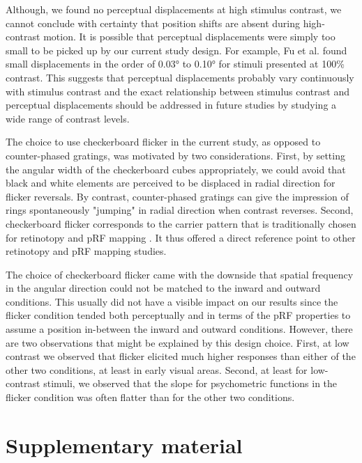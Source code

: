 Although, we found no perceptual displacements at high stimulus contrast, we cannot conclude with certainty that position shifts are absent during high-contrast motion. It is possible that perceptual displacements were simply too small to be picked up by our current study design. For example, Fu et al. \parencite*{Fu2004} found small displacements in the order of 0.03° to 0.10° for stimuli presented at 100\% contrast. This suggests that perceptual displacements probably vary continuously with stimulus contrast and the exact relationship between stimulus contrast and perceptual displacements should be addressed in future studies by studying a wide range of contrast levels.

The choice to use checkerboard flicker in the current study, as opposed to counter-phased gratings, was motivated by two considerations. First, by setting the angular width of the checkerboard cubes appropriately, we could avoid that black and white elements are perceived to be displaced in radial direction for flicker reversals. By contrast, counter-phased gratings can give the impression of rings spontaneously "jumping" in radial direction when contrast reverses. Second, checkerboard flicker corresponds to the carrier pattern that is traditionally chosen for retinotopy \parencite{Sereno1995} and pRF mapping \parencite{Dumoulin2008}. It thus offered a direct reference point to other retinotopy and pRF mapping studies.

The choice of checkerboard flicker came with the downside that spatial frequency in the angular direction could not be matched to the inward and outward conditions. This usually did not have a visible impact on our results since the flicker condition tended both perceptually and in terms of the pRF properties to assume a position in-between the inward and outward conditions. However, there are two observations that might be explained by this design choice. First, at low contrast we observed that flicker elicited much higher responses than either of the other two conditions, at least in early visual areas. Second, at least for low-contrast stimuli, we observed that the slope for psychometric functions in the flicker condition was often flatter than for the other two conditions.

\clearpage
\section{Supplementary material}
\beginsupplement

